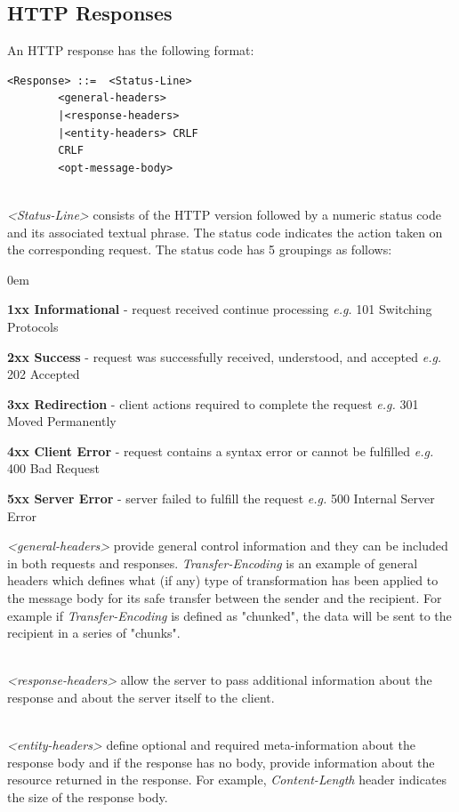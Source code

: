 \documentclass[a4paper,11pt,twoside]{report}
\begin{document}
\subsection{HTTP Responses}
An HTTP response has the following format:\bigskip

\begin{lstlisting}[language=terminal, xleftmargin=.3in,xrightmargin=3.25in]
<Response> ::=	<Status-Line>
		<general-headers>
		|<response-headers>
		|<entity-headers> CRLF
		CRLF 
		<opt-message-body>
\end{lstlisting} 
\noindent\\
\textit{<Status-Line>} consists of the HTTP version followed by a numeric status code and its associated textual phrase. The status code indicates the action taken on the corresponding request.  The status code has 5 groupings as follows:

\begin{list}{-}{}
\itemsep0em
\item \textbf{1xx Informational} - request received continue processing \textit{e.g.} 101 Switching Protocols
\item \textbf{2xx Success} - request was successfully received, understood, and accepted \textit{e.g.} 202 Accepted
\item \textbf{3xx Redirection} - client actions required to complete the request \textit{e.g.} 301 Moved Permanently
\item \textbf{4xx Client Error} - request contains a syntax error or cannot be fulfilled \textit{e.g.} 400 Bad Request
\item \textbf{5xx Server Error} - server failed to fulfill the request \textit{e.g.} 500 Internal Server Error
\end{list}
\noindent
\textit{<general-headers>} provide general control information and they can be included in both requests and responses. \textit{Transfer-Encoding} is an example of general headers which defines what (if any) type of transformation has been applied to the message body for its safe transfer between the sender and the recipient. For example if \textit{Transfer-Encoding} is defined as "chunked", the data will be sent to the recipient in a series of "chunks". 

\noindent\\
\textit{<response-headers>} allow the server to pass additional information about the response and about the server itself to the client. 

\noindent\\
\textit{<entity-headers>} define optional and required meta-information about the response body and if the response has no body, provide information about the resource returned in the response. For example, \textit{Content-Length} header indicates the size of the response body. 
\end{document}
